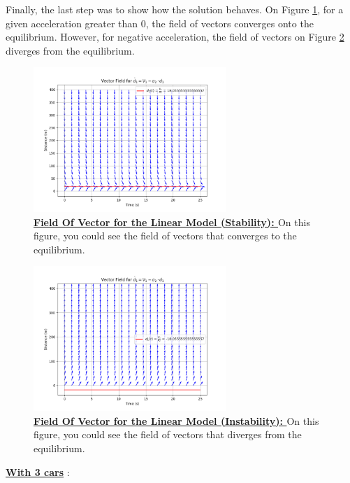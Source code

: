 \documentclass{article}
\begin{document}
		Finally, the last step was to show how the solution behaves. On Figure \ref{fig:FV1}, for a given acceleration greater than 0, the field of vectors converges onto the equilibrium. However, for negative acceleration, the field of vectors on Figure \ref{fig:FV2} diverges from the equilibrium.
		
		\begin{figure}[H]
			\centering
			\includegraphics[width=0.65\textwidth]{FieldOfVector_CV.png}
			\caption[Field Of Vector for the Linear Model (Stability)]{\textbf{\underline{Field Of Vector for the Linear Model (Stability): }} On this figure, you could see the field of vectors that converges to the equilibrium.}
			\label{fig:FV1}
		\end{figure}
		
		\begin{figure}[H]
			\centering
			\includegraphics[width=0.65\textwidth]{FieldOfVector_DV.png}
			\caption[Field Of Vector for the Linear Model (Instability)]{\textbf{\underline{Field Of Vector for the Linear Model (Instability): }} On this figure, you could see the field of vectors that diverges from the equilibrium.}
			\label{fig:FV2}
		\end{figure}
		
		\textbf{\underline{With 3 cars}} : \newline\newline
		
\end{document}
